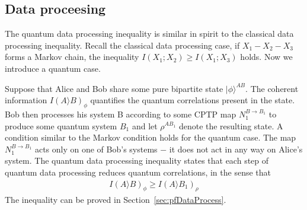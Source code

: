 \subsection{Data proceesing}
The quantum data processing inequality is similar in spirit to the classical data processing inequality.
Recall the classical data processing case, if $X_1-X_2-X_3$ forms a Markov chain, the inequality $I(X_1;X_2) \geq I(X_1;X_3)$ holds.
Now we introduce a quantum case.

Suppose that Alice and Bob share some pure bipartite state $|\phi \rangle ^{AB}$.
The coherent information $I(A\rangle B)_{\phi}$ quantifies the quantum correlations present in the state.
Bob then processes his system B according to some CPTP map $N_1^{B\to B_1}$ to produce some quantum system $B_1$ and let $\rho ^{AB_1}$ denote the resulting state.
A condition similar to the Markov condition holds for the quantum case.
The map $N_1^{B\to B_1}$ acts only on one of Bob's systems $-$ it does not act in any way on Alice's system.
The quantum data processing inequality states that each step of quantum data processing reduces quantum correlations, in the sense that
\begin{align}
I(A \rangle B)_{\phi} \geq I(A \rangle B_1)_{\rho}
\end{align}
The inequality can be proved in Section~\ref{sec:pfDataProcess}.